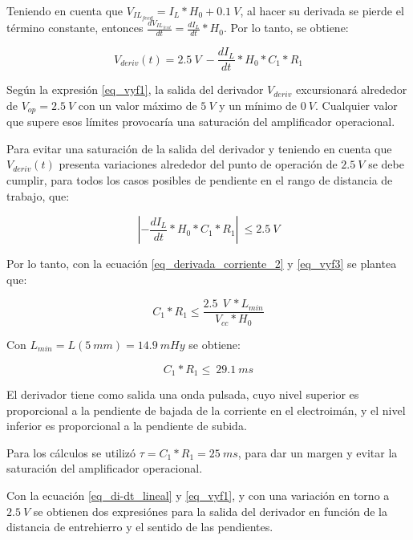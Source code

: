 Teniendo en cuenta que $V_{IL_{feed}}=I_L*H_0+0.1\:V$, al hacer su derivada se pierde el término constante, entonces $ \frac{dV_{IL_{feed}}}{dt}= \frac{dI_L}{dt}*H_0$. Por lo tanto, se obtiene:

\begin{equation} \label{eq_vyf1}
	V_{deriv}(t) = 2.5\:V\ -\frac{dI_L}{dt}*H_0*C_1*R_1
\end{equation}

Según la expresión \ref{eq_vyf1}, la salida del derivador $V_{deriv}$ excursionará alrededor de $V_{op}=2.5\:V$ con un valor máximo de $5\:V$ y un mínimo de $0\:V$. Cualquier valor que supere esos límites provocaría una saturación del amplificador operacional.

Para evitar una saturación de la salida del derivador y teniendo en cuenta que $V_{deriv}(t)$ presenta variaciones alrededor del punto de operación de $2.5\:V$ se debe cumplir, para todos los casos posibles de pendiente en el rango de distancia de trabajo, que:

\begin{equation} \label{eq_vyf3}
	\left|-\frac{dI_L}{dt}*H_0*C_1*R_1\right|\ \le 2.5\:V
\end{equation}

Por lo tanto, con la ecuación \ref{eq_derivada_corriente_2} y \ref{eq_vyf3} se plantea que:

\begin{equation} \label{eq_condicionC1-R1}
	C_1*R_1\le\frac{2.5\ \:V\ *L_{min}}{V_{cc}*H_0}
\end{equation}

Con $L_{min}= L(5\: mm) = 14.9\: mHy$ se obtiene: 

\begin{equation} \label{eq_condicionC1-R1-2}
	C_1*R_1\le\ 29.1\ ms
\end{equation}

El derivador tiene como salida una onda pulsada, cuyo nivel superior es proporcional a la pendiente de bajada de la corriente en el electroimán, y el nivel inferior es proporcional a la pendiente de subida.

Para los cálculos se utilizó $\tau = C_1*R_1= 25\:ms$, para dar un margen y evitar la saturación del amplificador operacional.  

Con la ecuación \ref{eq_di-dt_lineal} y \ref{eq_vyf1}, y con una variación en torno a $2.5\:V$ se obtienen dos expresiónes para la salida del derivador en función de la distancia de entrehierro y el sentido de las pendientes.


